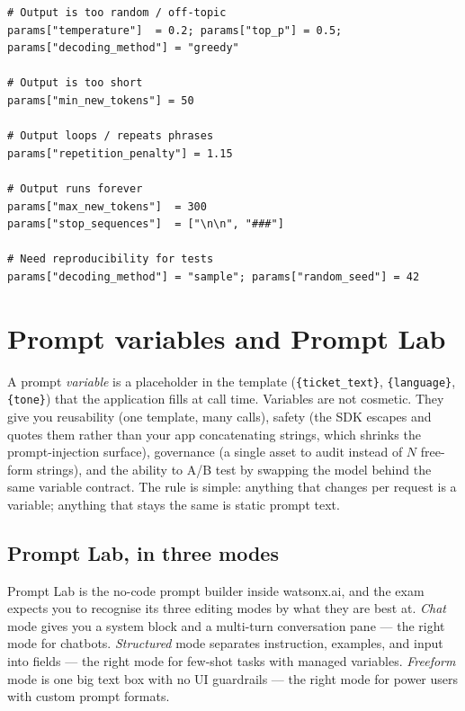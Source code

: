 \begin{examplebox}[title=\textbf{Symptom-to-parameter cheat sheet}]
\begin{lstlisting}[style=pythonstyle]
# Output is too random / off-topic
params["temperature"]  = 0.2; params["top_p"] = 0.5; params["decoding_method"] = "greedy"

# Output is too short
params["min_new_tokens"] = 50

# Output loops / repeats phrases
params["repetition_penalty"] = 1.15

# Output runs forever
params["max_new_tokens"]  = 300
params["stop_sequences"]  = ["\n\n", "###"]

# Need reproducibility for tests
params["decoding_method"] = "sample"; params["random_seed"] = 42
\end{lstlisting}
\end{examplebox}

\section{Prompt variables and Prompt Lab}

A prompt \emph{variable} is a placeholder in the template (\texttt{\{ticket\_text\}}, \texttt{\{language\}}, \texttt{\{tone\}}) that the application fills at call time. Variables are not cosmetic. They give you reusability (one template, many calls), safety (the SDK escapes and quotes them rather than your app concatenating strings, which shrinks the prompt-injection surface), governance (a single asset to audit instead of $N$ free-form strings), and the ability to A/B test by swapping the model behind the same variable contract. The rule is simple: anything that changes per request is a variable; anything that stays the same is static prompt text.

\subsection{Prompt Lab, in three modes}

Prompt Lab is the no-code prompt builder inside watsonx.ai, and the exam expects you to recognise its three editing modes by what they are best at. \emph{Chat} mode gives you a system block and a multi-turn conversation pane --- the right mode for chatbots. \emph{Structured} mode separates instruction, examples, and input into fields --- the right mode for few-shot tasks with managed variables. \emph{Freeform} mode is one big text box with no UI guardrails --- the right mode for power users with custom prompt formats.

